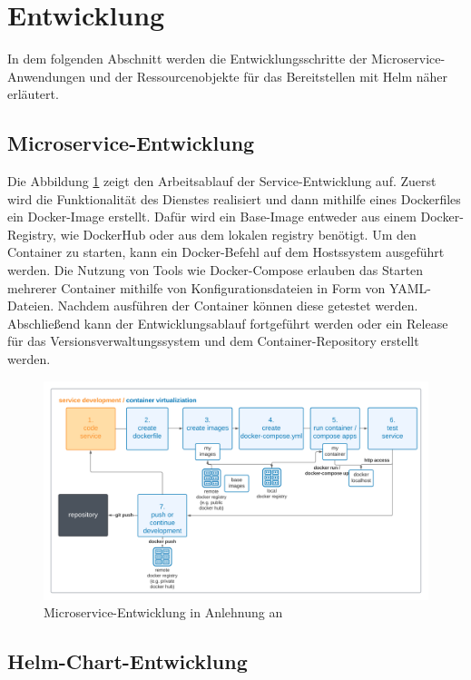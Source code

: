 \section{Entwicklung}
In dem folgenden Abschnitt werden die Entwicklungsschritte der Microservice-Anwendungen und der Ressourcenobjekte für das Bereitstellen mit Helm näher erläutert.


\subsection{Microservice-Entwicklung}
Die Abbildung \ref{fig:DevWorkflowDocker} zeigt den Arbeitsablauf der Service-Entwicklung auf.
Zuerst wird die Funktionalität des Dienstes realisiert und dann mithilfe eines Dockerfiles ein Docker-Image erstellt.
Dafür wird ein Base-Image entweder aus einem Docker-Registry, wie DockerHub oder aus dem lokalen registry benötigt.
Um den Container zu starten, kann ein Docker-Befehl auf dem Hostssystem ausgeführt werden.
Die Nutzung von Tools wie Docker-Compose erlauben das Starten mehrerer Container mithilfe von Konfigurationsdateien in Form von YAML-Dateien.
Nachdem ausführen der Container können diese getestet werden.
Abschließend kann der Entwicklungsablauf fortgeführt werden oder ein Release für das Versionsverwaltungssystem und dem Container-Repository erstellt werden.


\begin{figure}[!htb]
    \centering
    \includegraphics[width=1.0\columnwidth]{images/DevWorkflowDocker.png}
    \caption{Microservice-Entwicklung in Anlehnung an \cite{dockerappsworkflow}}
    \label{fig:DevWorkflowDocker}
\end{figure}


\subsection{Helm-Chart-Entwicklung}

